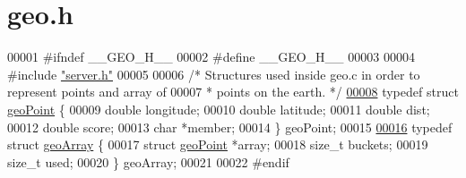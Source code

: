 \hypertarget{geo_8h_source}{}\section{geo.\+h}
\label{geo_8h_source}

\begin{DoxyCode}
00001 \textcolor{preprocessor}{#}\textcolor{preprocessor}{ifndef} \textcolor{preprocessor}{\_\_GEO\_H\_\_}
00002 \textcolor{preprocessor}{#}\textcolor{preprocessor}{define} \textcolor{preprocessor}{\_\_GEO\_H\_\_}
00003 
00004 \textcolor{preprocessor}{#}\textcolor{preprocessor}{include} \hyperlink{server_8h}{"server.h"}
00005 
00006 \textcolor{comment}{/* Structures used inside geo.c in order to represent points and array of}
00007 \textcolor{comment}{ * points on the earth. */}
\hyperlink{structgeoPoint}{00008} \textcolor{keyword}{typedef} \textcolor{keyword}{struct} \hyperlink{structgeoPoint}{geoPoint} \{
00009     \textcolor{keywordtype}{double} longitude;
00010     \textcolor{keywordtype}{double} latitude;
00011     \textcolor{keywordtype}{double} dist;
00012     \textcolor{keywordtype}{double} score;
00013     \textcolor{keywordtype}{char} *member;
00014 \} geoPoint;
00015 
\hyperlink{structgeoArray}{00016} \textcolor{keyword}{typedef} \textcolor{keyword}{struct} \hyperlink{structgeoArray}{geoArray} \{
00017     \textcolor{keyword}{struct} \hyperlink{structgeoPoint}{geoPoint} *array;
00018     size\_t buckets;
00019     size\_t used;
00020 \} geoArray;
00021 
00022 \textcolor{preprocessor}{#}\textcolor{preprocessor}{endif}
\end{DoxyCode}
